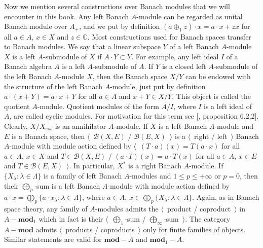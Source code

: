 Now we mention several constructions over Banach modules that we will encounter
in this book.  Any left Banach $A$-module can be regarded as unital Banach
module over $A_+$, and we put by definition $(a\oplus_1 z)\cdot x=a\cdot x+zx$
for all $a\in A$, $x\in X$ and $z\in\mathbb{C}$. Most constructions used for
Banach spaces transfer to Banach modules.  We say that a linear subspace $ Y$ of
a left Banach $A$-module $X$ is a left $A$-submodule of $X$ 
if $A\cdot Y\subset Y$. For example, any left ideal $I$ of a 
Banach algebra $A$ is a left $A$-submodule of $A$. If $Y$ is a closed left
$A$-submodule of the left Banach $A$-module $X$, then the Banach space $X/Y$ can
be endowed with the structure of the left Banach $A$-module, just put by
definition $a\cdot(x+Y)=a\cdot x+Y$ for all $a\in A$ and $x+Y\in X/Y$. This
object is called the quotient $A$-module. Quotient modules of the form $A/I$,
where $I$ is a left ideal of $A$, are called cyclic modules. For motivation for
this term see [\cite{HelBanLocConvAlg}, proposition 6.2.2]. Clearly, $X/X_{ess}$
is an annihilator $A$-module. If $X$ is a left Banach $A$-module and $E$ is a
Banach space, then $\langle$~$\mathcal{B}(X,E)$ / $\mathcal{B}(E,X)$~$\rangle$
is a $\langle$~right / left~$\rangle$ Banach $A$-module with module action
defined by $\langle$~$(T\cdot a)(x)=T(a\cdot x)$ for all $a\in A$, $x\in X$ and
$T\in\mathcal{B}(X, E)$ / $(a\cdot T)(x)=a\cdot T(x)$ for all $a\in A$, $x\in E$
and $T\in\mathcal{B}(E, X)$~$\rangle$. In particular, $X^*$ is a right Banach
$A$-module. If $ \{X_\lambda:\lambda\in\Lambda \}$ is a family of left Banach
$A$-modules and $1\leq p\leq +\infty$ or $p=0$, then their $\bigoplus_p$-sum is
a left Banach $A$-module with module action defined 
by $a\cdot x=\bigoplus_p \{a\cdot x_\lambda:\lambda\in\Lambda \}$, 
where $a\in A$, $x\in\bigoplus_p \{X_\lambda:\lambda\in\Lambda \}$. 
Again, as in Banach space theory, any family
of $A$-modules admits the $\langle$~product / coproduct~$\rangle$ in
$A-\mathbf{mod}_1$ which in fact is their $\langle$~$\bigoplus_1$-sum /
$\bigoplus_\infty$-sum~$\rangle$. The category $A-\mathbf{mod}$ admits
$\langle$~products / coproducts~$\rangle$ only for finite families of objects.
Similar statements are valid for $\mathbf{mod}-A$ and $\mathbf{mod}_1-A$.

